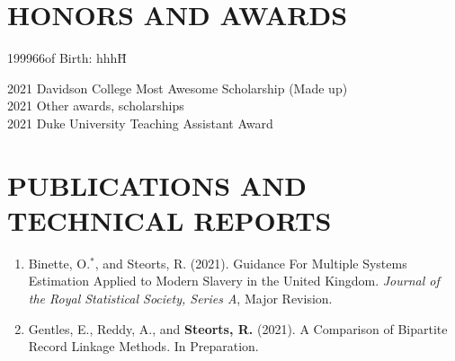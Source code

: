 \documentclass[12pt,leqno]{article}
\begin{document}
\section*{\normalsize HONORS AND AWARDS}
\begin{tabbing}
199966of Birth: hhhH\=\kill

2021 \> Davidson College Most Awesome Scholarship (Made up)\\

2021 \> Other awards, scholarships \\

2021 \> Duke University Teaching Assistant Award\\[.2cm]

\end{tabbing}

\section*{\normalsize PUBLICATIONS AND TECHNICAL REPORTS}
\begin{enumerate}

%

\item Binette, O.$^{*}$, and { Steorts, R.} (2021). Guidance For Multiple Systems Estimation Applied to Modern Slavery in the United Kingdom. \emph{Journal of the Royal Statistical Society, Series A}, Major Revision. 

\item Gentles, E., Reddy, A., and {\bf Steorts, R.} (2021). A Comparison of Bipartite Record Linkage Methods. In Preparation. 
 
\end{enumerate}
\end{document}
